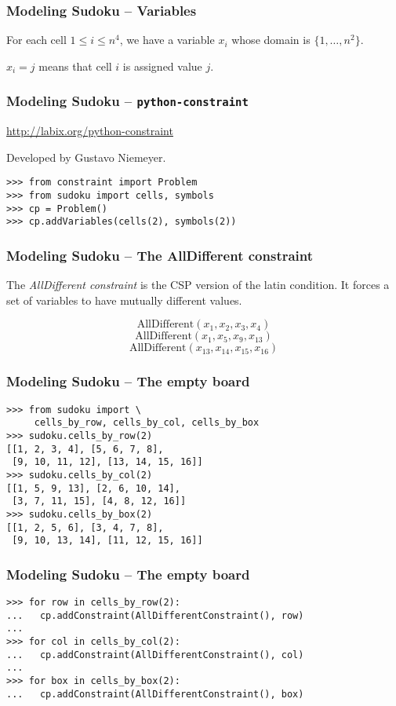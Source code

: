 \documentclass{beamer}
\begin{document}
\begin{frame}[fragile]
\frametitle{Modeling Sudoku -- Variables}

For each cell $1\leq i \leq n^4$, we have a variable $x_i$ whose domain is $\{1,\ldots,n^2\}$.

$x_i = j$ means that cell $i$ is assigned value $j$.

\end{frame}

\begin{frame}[fragile]
\frametitle{Modeling Sudoku -- \texttt{python-constraint}}

\url{http://labix.org/python-constraint}

Developed by Gustavo Niemeyer.

\begin{lstlisting}
>>> from constraint import Problem
>>> from sudoku import cells, symbols
>>> cp = Problem()
>>> cp.addVariables(cells(2), symbols(2))
\end{lstlisting}

\end{frame}

\begin{frame}[fragile]
\frametitle{Modeling Sudoku -- The AllDifferent constraint}

The \emph{AllDifferent constraint} is the CSP version of the latin condition. It forces a set of variables to have mutually different values.

\[\mbox{AllDifferent}(x_{1}, x_{2}, x_{3}, x_{4})\]
\[\mbox{AllDifferent}(x_{1}, x_{5}, x_{9}, x_{13})\]
\[\mbox{AllDifferent}(x_{13}, x_{14}, x_{15}, x_{16})\]

\end{frame}

\begin{frame}[fragile]
\frametitle{Modeling Sudoku -- The empty board}

\begin{lstlisting}
>>> from sudoku import \
     cells_by_row, cells_by_col, cells_by_box
>>> sudoku.cells_by_row(2)
[[1, 2, 3, 4], [5, 6, 7, 8],
 [9, 10, 11, 12], [13, 14, 15, 16]]
>>> sudoku.cells_by_col(2)
[[1, 5, 9, 13], [2, 6, 10, 14], 
 [3, 7, 11, 15], [4, 8, 12, 16]]
>>> sudoku.cells_by_box(2)
[[1, 2, 5, 6], [3, 4, 7, 8], 
 [9, 10, 13, 14], [11, 12, 15, 16]]
\end{lstlisting}

\end{frame}


\begin{frame}[fragile]
\frametitle{Modeling Sudoku -- The empty board}

\begin{lstlisting}
>>> for row in cells_by_row(2):
...   cp.addConstraint(AllDifferentConstraint(), row)
... 
>>> for col in cells_by_col(2):
...   cp.addConstraint(AllDifferentConstraint(), col)
... 
>>> for box in cells_by_box(2):
...   cp.addConstraint(AllDifferentConstraint(), box)
\end{lstlisting}

\end{frame}
\end{document}
